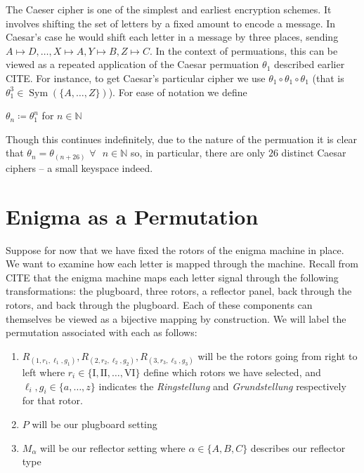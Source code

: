 \begin{example}
  The Caeser cipher is one of the simplest and earliest encryption
  schemes. It involves shifting
  the set of letters by a fixed amount to encode a message. In
  Caesar's case he would shift each letter in a message by three places,
  sending $A\mapsto D,\dots, X\mapsto A, Y\mapsto B, Z\mapsto C$. In
  the context of permuations, this can be viewed as a repeated
  application of the Caesar permuation $\theta_1$ described earlier
  CITE. For instance, to get Caesar's particular cipher
  we use $\theta_1\circ\theta_1\circ\theta_1$ (that is
  $\theta_1^3\in\operatorname{Sym}(\{A,\dots,Z\})$). For ease of
  notation we define
  \begin{center}
    $\theta_n\coloneq\theta_1^n$ for $n\in\mathbb{N}$
  \end{center}
  Though this continues indefinitely, due to the nature of the
  permuation it is clear that $\theta_n = \theta_{(n+26)}$
  $\forall\text{ }n\in\mathbb{N}$ so, in particular,
  there are only $26$ distinct Caesar ciphers -- a small keyspace indeed.
\end{example}

\section{Enigma as a Permutation}

Suppose for now that we have fixed the rotors of the enigma machine
in place. We want to examine how each letter is mapped through the machine.
Recall from CITE that the enigma machine maps each letter signal
through the following transformations: the plugboard, three rotors, a
reflector panel, back through the rotors,
and back through the plugboard. Each of these components can
themselves be viewed as a bijective mapping by construction. We will
label the permutation associated with each  as follows:
\begin{enumerate}
  \item $R_{(1,r_1, \ell_1, g_1)}, R_{(2, r_2, \ell_2, g_2)}, R_{(3,
    r_3, \ell_3, g_3)}$ will be the rotors going from right to left where
    $r_i\in \{\text{I}, \text{II}, \dots, \text{VI}\}$ define which
    rotors we have selected, and $\ell_i, g_i\in\{a, \dots, z\}$
    indicates the \emph{Ringstellung} and \emph{Grundstellung}
    respectively for that rotor.
  \item $P$ will be our plugboard setting
  \item $M_\alpha$ will be our reflector setting where $\alpha\in\{A,
    B, C\}$ describes our reflector type
\end{enumerate}

